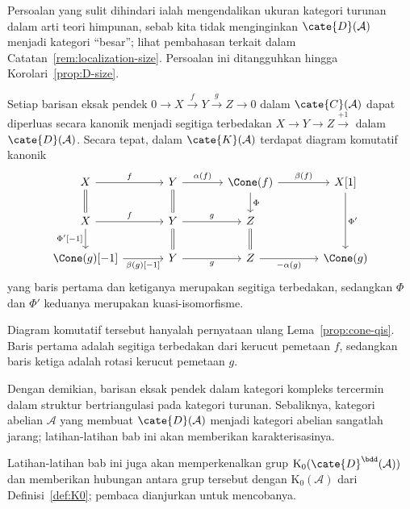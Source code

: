 Persoalan yang sulit dihindari ialah mengendalikan ukuran kategori turunan
dalam arti teori himpunan, sebab kita tidak menginginkan
$\cate{D}(\mathcal{A})$ menjadi kategori ``besar''; lihat pembahasan terkait
dalam Catatan~\ref{rem:localization-size}. Persoalan ini ditangguhkan hingga
Korolari~\ref{prop:D-size}.

\begin{proposisi}\label{prop:ses-vs-triangle}
	Setiap barisan eksak pendek
	$0 \to X \xrightarrow{f} Y \xrightarrow{g} Z \to 0$ dalam
	$\cate{C}(\mathcal{A})$ dapat diperluas secara kanonik menjadi segitiga
	terbedakan $X \to Y \to Z \xrightarrow{+1}$ dalam
	$\cate{D}(\mathcal{A})$. Secara tepat, dalam $\cate{K}(\mathcal{A})$
	terdapat diagram komutatif kanonik
	\[\begin{tikzcd}[column sep=large]
		X \arrow[r, "f"] \arrow[equal, d] & Y \arrow[equal, d] \arrow[r, "\alpha(f)"] & \Cone(f) \arrow[r, "\beta(f)"] \arrow[d, "\Phi"] & {X[1]} \arrow[dd, "{\Phi'}"] \\
		X \arrow[r, "f"] \arrow[d, "{\Phi'[-1]}"'] & Y \arrow[r, "g"] \arrow[equal, d] & Z \arrow[equal, d] & \\
		{\Cone(g)[-1]} \arrow[r, "{\beta(g)[-1]}"'] & Y \arrow[r, "g"'] & Z \arrow[r, "{-\alpha(g)}"'] & \Cone(g)
	\end{tikzcd}\]
	yang baris pertama dan ketiganya merupakan segitiga terbedakan, sedangkan
	$\Phi$ dan $\Phi'$ keduanya merupakan kuasi-isomorfisme.
\end{proposisi}

\begin{bukti}
	Diagram komutatif tersebut hanyalah pernyataan ulang
	Lema~\ref{prop:cone-qis}. Baris pertama adalah segitiga terbedakan dari
	kerucut pemetaan $f$, sedangkan baris ketiga adalah rotasi kerucut pemetaan
	$g$.
\end{bukti}

Dengan demikian, barisan eksak pendek dalam kategori kompleks tercermin dalam
struktur bertriangulasi pada kategori turunan. Sebaliknya, kategori
abelian $\mathcal{A}$ yang membuat $\cate{D}(\mathcal{A})$ menjadi kategori
abelian sangatlah jarang; latihan-latihan bab ini akan memberikan
karakterisasinya.

Latihan-latihan bab ini juga akan memperkenalkan grup
$\mathrm{K}_0(\cate{D}^{\bdd}(\mathcal{A}))$ dan memberikan hubungan antara
grup tersebut dengan $\mathrm{K}_0(\mathcal{A})$ dari
Definisi~\ref{def:K0}; pembaca dianjurkan untuk mencobanya.

